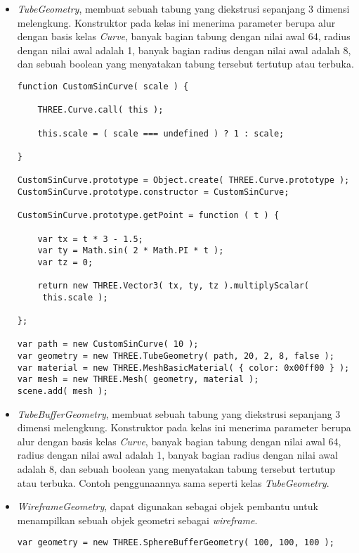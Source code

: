 \begin{itemize}
\begin{itemize}
	\item {\it TubeGeometry}, membuat sebuah tabung yang diekstrusi sepanjang 3 dimensi melengkung. Konstruktor pada kelas ini menerima parameter berupa alur dengan basis kelas {\it Curve}, banyak bagian tabung dengan nilai awal 64, radius dengan nilai awal adalah 1, banyak bagian radius dengan nilai awal adalah 8, dan sebuah boolean yang menyatakan tabung tersebut tertutup atau terbuka.
	
\begin{lstlisting}[caption={Contoh penggunaan kelas {\it TubeGeometry}.},captionpos=b]
function CustomSinCurve( scale ) {

	THREE.Curve.call( this );

	this.scale = ( scale === undefined ) ? 1 : scale;

}

CustomSinCurve.prototype = Object.create( THREE.Curve.prototype );
CustomSinCurve.prototype.constructor = CustomSinCurve;

CustomSinCurve.prototype.getPoint = function ( t ) {

	var tx = t * 3 - 1.5;
	var ty = Math.sin( 2 * Math.PI * t );
	var tz = 0;

	return new THREE.Vector3( tx, ty, tz ).multiplyScalar(
	 this.scale );

};

var path = new CustomSinCurve( 10 );
var geometry = new THREE.TubeGeometry( path, 20, 2, 8, false );
var material = new THREE.MeshBasicMaterial( { color: 0x00ff00 } );
var mesh = new THREE.Mesh( geometry, material );
scene.add( mesh );
\end{lstlisting}

	\item {\it TubeBufferGeometry},  membuat sebuah tabung yang diekstrusi sepanjang 3 dimensi melengkung. Konstruktor pada kelas ini menerima parameter berupa alur dengan basis kelas {\it Curve}, banyak bagian tabung dengan nilai awal 64, radius dengan nilai awal adalah 1, banyak bagian radius dengan nilai awal adalah 8, dan sebuah boolean yang menyatakan tabung tersebut tertutup atau terbuka. Contoh penggunaannya sama seperti kelas {\it TubeGeometry}.
	
	\item {\it WireframeGeometry}, dapat digunakan sebagai objek pembantu untuk menampilkan sebuah objek geometri sebagai {\it wireframe}.
	
\begin{lstlisting}[caption={Contoh penggunaan kelas {\it WireframeGeometry}.},captionpos=b]
var geometry = new THREE.SphereBufferGeometry( 100, 100, 100 );


\end{lstlisting}
\end{itemize}
\end{itemize}

